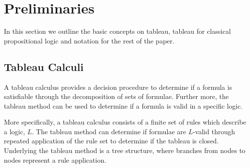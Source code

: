 \documentclass{llncs}
\begin{document}
\section{Preliminaries}
%
In this section we outline the basic concepts on tableau, tableau for classical
propositional logic and notation for the rest of the paper.
%
\subsection{Tableau Calculi}
%
A tableau calculus provides a decision procedure to determine if a formula
is satisfiable through the decomposition of sets of formulae. Further more,
the tableau method can be used to determine if a formula is valid in a specific
logic.

More specifically, a tableau calculus consists of a finite set of rules which
describe a logic, $L$. The tableau method can determine if formulae
are $L$-valid through repeated application of the rule set to
determine if the tableau is closed. Underlying the tableau method is a tree
structure, where branches from nodes to nodes represent a rule application.
%
\end{document}
